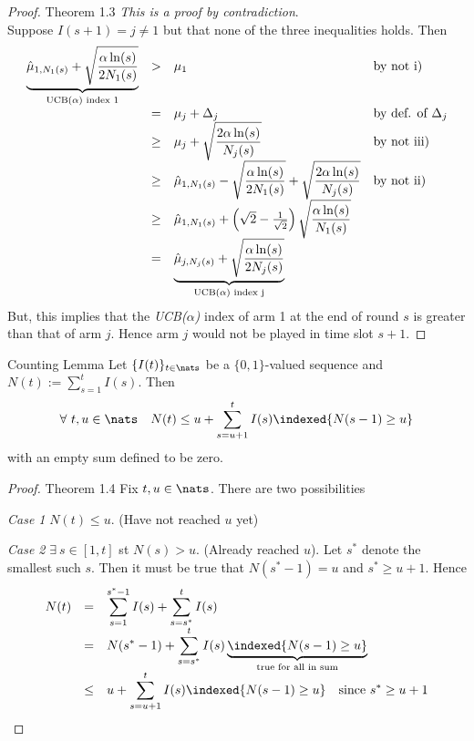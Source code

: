 \documentclass[11pt,a4paper]{article}
\begin{document}
  \begin{proof}{Theorem 1.3}
    \textit{This is a proof by contradiction}.\\
    Suppose $I(s+1)=j\neq1$ but that none of the three inequalities holds. Then
    \[\begin{array}{rcll}
      \underbrace{\hat\mu_{1,N_1(s)}+\displaystyle\sqrt{\frac{\alpha\ln(s)}{2N_1(s)}}}_{\tiny\text{UCB($\alpha$) index 1}}&>&\mu_1&\text{by not i)}\\
      &=&\mu_j+\Delta_j&\text{by def. of $\Delta_j$}\\
      &\geq&\mu_j+\displaystyle\sqrt{\frac{2\alpha\ln(s)}{N_j(s)}}&\text{by not iii)}\\
      &\geq&\hat\mu_{1,N_1(s)}-\displaystyle\sqrt{\frac{\alpha\ln(s)}{2N_1(s)}}+\sqrt{\frac{2\alpha\ln(s)}{N_j(s)}}&\text{by not ii)}\\
      &\geq&\hat\mu_{1,N_1(s)}+\left(\sqrt2-\frac1{\sqrt2}\right)\sqrt{\dfrac{\alpha\ln(s)}{N_1(s)}}\\
      &=&\displaystyle\underbrace{\hat\mu_{j,N_j(s)}+\sqrt{\frac{\alpha\ln(s)}{2N_j(s)}}}_{\tiny\text{UCB($\alpha$) index j}}
    \end{array}\]
    But, this implies that the \textit{UCB($\alpha$)} index of arm 1 at the end of round $s$ is greater than that of arm $j$. Hence arm $j$ would not be played in time slot $s+1$.\proved
  \end{proof}

  \begin{theorem}{Counting Lemma}
    Let $\{I(t)\}_{t\in\nats}$ be a $\{0,1\}$-valued sequence and $N(t):=\sum_{s=1}^tI(s)$. Then
    \[ \forall\ t,u\in\nats\quad N(t)\leq u+\sum_{s=u+1}^tI(s)\indexed\{N(s-1)\geq u\} \]
    with an empty sum defined to be zero.
  \end{theorem}

  \begin{proof}{Theorem 1.4}
    Fix $t,u\in\nats$. There are two possibilities
    \par\textit{Case 1} $N(t)\leq u$. (Have not reached $u$ yet)

    \par\textit{Case 2} $\exists\ s\in[1,t]$ st $N(s)>u$. (Already reached $u$). Let $s^*$ denote the smallest such $s$. Then it must be true that $N(s^*-1)=u$ and $s^*\geq u+1$. Hence
    \[\begin{array}{rcl}
      N(t)&=&\displaystyle\sum_{s=1}^{s^*-1}I(s)+\sum_{s=s^*}^tI(s)\\
      &=&\displaystyle N(s^*-1)+\sum_{s=s^*}^tI(s)\underbrace{\indexed\{N(s-1)\geq u\}}_{\tiny\text{true for all in sum}}\\
      &\leq&\displaystyle u+\sum_{s=u+1}^tI(s)\indexed\{N(s-1)\geq u\}\quad\text{since }s^*\geq u+1
    \end{array}\]
    \proved
  \end{proof}
\end{document}
